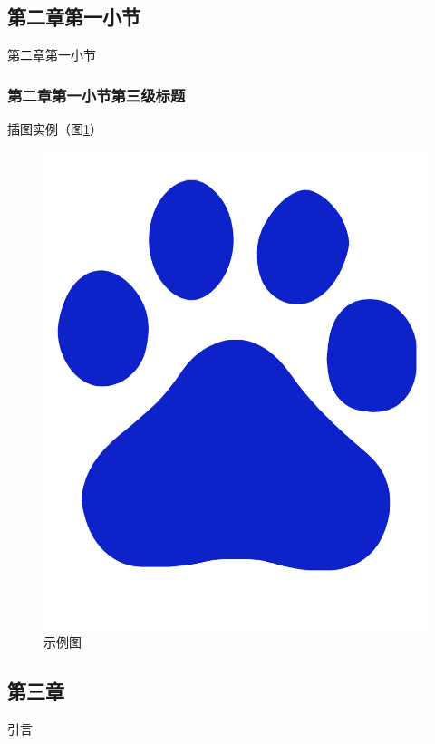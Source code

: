 \documentclass[twoside]{CUGThesis}
\begin{document}
	\subsection{第二章第一小节}
	第二章第一小节
	\subsubsection{第二章第一小节第三级标题}
	插图实例（图\ref{Fig:example}）
	\begin{figure}[!t]
		\centering
		\includegraphics[scale=0.5]{Figures/example.jpg}
		\caption{示例图}
		\label{Fig:example}
	\end{figure}
	
	
	
	\begin{spacing}{2}
		\section{第三章}
	\end{spacing}
	引言
\end{document}
